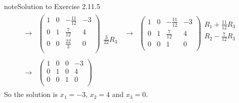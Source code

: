 \documentclass[letterpaper,10pt,english]{jupyterBook}
\begin{document}
\begin{sphinxadmonition}{note}{Solution to Exercise 2.11.5}
\begin{equation*}
\begin{split}
\begin{align*}
    \longrightarrow 
    & \left( \begin{array}{ccc|c} 
         1 & 0 & - \frac{11}{12} & -3 \\ 
         0 & 1 & \frac{7}{12} & 4 \\ 
         0 & 0 & \frac{22}{3} & 0 \\ 
    \end{array} \right) 
    \begin{array}{l} \phantom{x} \\ \phantom{x} \\ \frac{3}{22} R_{3}\end{array} & 
    \longrightarrow 
    & \left( \begin{array}{ccc|c} 
         1 & 0 & - \frac{11}{12} & -3 \\ 
         0 & 1 & \frac{7}{12} & 4 \\ 
         0 & 0 & 1 & 0 \\ 
    \end{array} \right) 
    \begin{array}{l} R_{1} + \frac{11}{12} R_{3}\\ R_{2} - \frac{7}{12} R_{3} \\ \phantom{x} \end{array} \\ \\ 
    \longrightarrow 
    & \left( \begin{array}{ccc|c} 
         1 & 0 & 0 & -3 \\ 
         0 & 1 & 0 & 4 \\ 
         0 & 0 & 1 & 0 \\ 
    \end{array} \right) 
\end{align*} \end{split}
\end{equation*}
\sphinxAtStartPar
So the solution is \(x_{1} = -3\), \(x_{2} = 4\) and \(x_{3} = 0\).


\end{sphinxadmonition}
\end{document}
